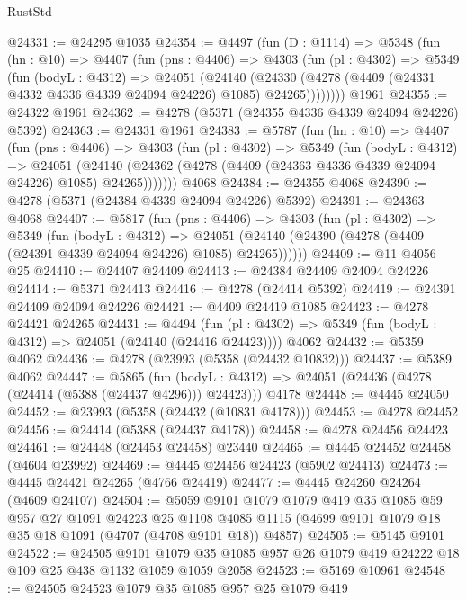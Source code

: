 \begin{lexlean}{RustStd}
\begin{coremodule}
{\begin{coremodule}
{{{{{{{{{{{{{{{{{{{{{{{{{{{{{{{{{{{@24331 := @24295 @1035
@24354 := @4497
    (fun (D : @1114) =>
    @5348
      (fun (hn : @10) =>
      @4407
        (fun (pns : @4406) =>
        @4303
          (fun (pl : @4302) =>
          @5349
            (fun (bodyL : @4312) =>
            @24051
              (@24140
                (@24330 (@4278 (@4409 (@24331 @4332 @4336 @4339 @24094 @24226) @1085) @24265))))))))
    @1961
@24355 := @24322 @1961
@24362 := @4278 (@5371 (@24355 @4336 @4339 @24094 @24226) @5392)
@24363 := @24331 @1961
@24383 := @5787
    (fun (hn : @10) =>
    @4407
      (fun (pns : @4406) =>
      @4303
        (fun (pl : @4302) =>
        @5349
          (fun (bodyL : @4312) =>
          @24051
            (@24140 (@24362 (@4278 (@4409 (@24363 @4336 @4339 @24094 @24226) @1085) @24265)))))))
    @4068
@24384 := @24355 @4068
@24390 := @4278 (@5371 (@24384 @4339 @24094 @24226) @5392)
@24391 := @24363 @4068
@24407 := @5817
    (fun (pns : @4406) =>
    @4303
      (fun (pl : @4302) =>
      @5349
        (fun (bodyL : @4312) =>
        @24051 (@24140 (@24390 (@4278 (@4409 (@24391 @4339 @24094 @24226) @1085) @24265))))))
@24409 := @11 @4056 @25
@24410 := @24407 @24409
@24413 := @24384 @24409 @24094 @24226
@24414 := @5371 @24413
@24416 := @4278 (@24414 @5392)
@24419 := @24391 @24409 @24094 @24226
@24421 := @4409 @24419 @1085
@24423 := @4278 @24421 @24265
@24431 := @4494
    (fun (pl : @4302) => @5349 (fun (bodyL : @4312) => @24051 (@24140 (@24416 @24423))))
    @4062
@24432 := @5359 @4062
@24436 := @4278 (@23993 (@5358 (@24432 @10832)))
@24437 := @5389 @4062
@24447 := @5865
    (fun (bodyL : @4312) => @24051 (@24436 (@4278 (@24414 (@5388 (@24437 @4296))) @24423)))
    @4178
@24448 := @4445 @24050
@24452 := @23993 (@5358 (@24432 (@10831 @4178)))
@24453 := @4278 @24452
@24456 := @24414 (@5388 (@24437 @4178))
@24458 := @4278 @24456 @24423
@24461 := @24448 (@24453 @24458) @23440
@24465 := @4445 @24452 @24458 (@4604 @23992)
@24469 := @4445 @24456 @24423 (@5902 @24413)
@24473 := @4445 @24421 @24265 (@4766 @24419)
@24477 := @4445 @24260 @24264 (@4609 @24107)
@24504 := @5059
    @9101
    @1079
    @1079
    @419
    @35
    @1085
    @59
    @957
    @27
    @1091
    @24223
    @25
    @1108
    @4085
    @1115
    (@4699 @9101 @1079 @18 @35 @18 @1091 (@4707 (@4708 @9101 @18)) @4857)
@24505 := @5145 @9101
@24522 := @24505
    @9101
    @1079
    @35
    @1085
    @957
    @26
    @1079
    @419
    @24222
    @18
    @109
    @25
    @438
    @1132
    @1059
    @1059
    @2058
@24523 := @5169 @10961
@24548 := @24505
    @24523
    @1079
    @35
    @1085
    @957
    @25
    @1079
    @419
}}}}}}}}}}}}}}}}}}}}}}}}}}}}}}}}}}}
\end{coremodule}}
\end{coremodule}
\end{lexlean}
